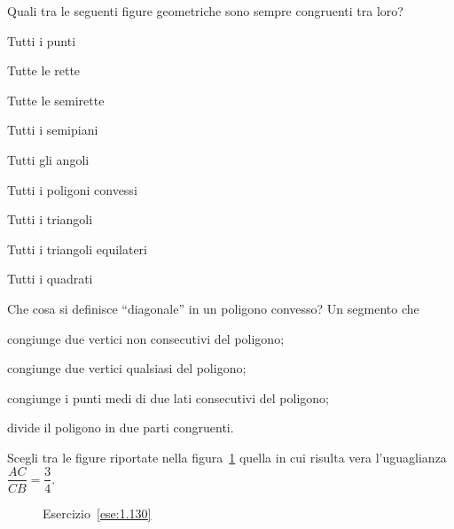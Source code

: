\begin{esercizio}
\label{ese:1.128}
Quali tra le seguenti figure geometriche sono sempre congruenti tra 
loro?
\begin{multicols}{2}
\begin{enumeratea}
\item Tutti i punti				
\tab\tab\boxV\quad\boxF
\item Tutte le rette				
\tab\tab\boxV\quad\boxF
\item Tutte le semirette				
\tab\boxV\quad\boxF
\item Tutti i semipiani				\tab\boxV\quad\boxF
\item Tutti gli angoli			\tab\tab\boxV\quad\boxF
\item Tutti i poligoni convessi		\tab\boxV\quad\boxF
\item Tutti i triangoli			\tab\tab\boxV\quad\boxF
\item Tutti i triangoli equilateri	\tab\boxV\quad\boxF
\item Tutti i quadrati			\tab\tab\boxV\quad\boxF
\end{enumeratea}
\end{multicols}
\end{esercizio}


\begin{esercizio}
\label{ese:1.129}
Che cosa si definisce ``diagonale'' in un poligono convesso? Un 
segmento che
\begin{enumeratea}
\item congiunge due vertici non consecutivi del poligono;
\item congiunge due vertici qualsiasi del poligono;
\item congiunge i punti medi di due lati consecutivi del poligono;
\item divide il poligono in due parti congruenti.
\end{enumeratea}
\end{esercizio}

	
\begin{esercizio}
\label{ese:1.130}
Scegli tra le figure riportate nella figura~\ref{fig:ese1.130} quella 
in cui risulta vera l'uguaglianza \(\dfrac{AC}{CB}=\dfrac{3}{4}\).
\end{esercizio}


\begin{inaccessibleblock}
 \begin{figure}[htb]
 \centering
 \caption{Esercizio~\ref{ese:1.130}}\label{fig:ese1.130}
\end{figure}
\end{inaccessibleblock}

